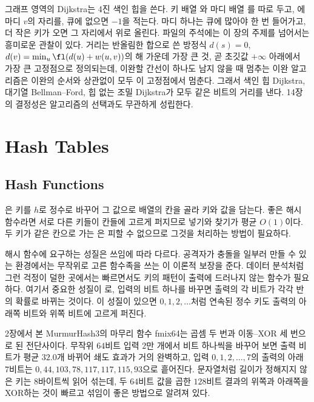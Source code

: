 \begin{instardust}
그래프 영역의 Dijkstra는 4진 색인 힙을 쓴다. 키 배열 와 마디 배열 를 따로 두고, 에 마디 $v$의 자리를, 큐에 없으면 $-1$을 적는다. 마디 하나는 큐에 많아야 한 번 들어가고, 더 작은 키가 오면 그 자리에서 위로 올린다. 파일의 주석에는 이 장의 주제를 넘어서는 흥미로운 관찰이 있다. 거리는 반올림한 합으로 쓴 방정식 $d(s)=0$, $d(v)=\min_u\fl(d(u)+w(u,v))$의 해 가운데 가장 큰 것, 곧 초깃값 $+\infty$ 아래에서 가장 큰 고정점으로 정의되는데, 이완할 간선이 하나도 남지 않을 때 멈추는 이완 알고리즘은 이완의 순서와 상관없이 모두 이 고정점에서 멈춘다. 그래서 색인 힙 Dijkstra, 대기열 Bellman--Ford, 힙 없는 조밀 Dijkstra가 모두 같은 비트의 거리를 낸다. 14장의 결정성은 알고리즘의 선택과도 무관하게 성립한다.
\end{instardust}

\section{Hash Tables}
\label{sec:hash-table}

\subsection{Hash Functions}

은 키를  $h$로 정수로 바꾸어 그 값으로 배열의 칸을 골라 키와 값을 담는다. 좋은 해시 함수라면 서로 다른 키들이 칸들에 고르게 퍼지므로 넣기와 찾기가 평균 $O(1)$이다. 두 키가 같은 칸으로 가는 은 피할 수 없으므로 그것을 처리하는 방법이 필요하다.

해시 함수에 요구하는 성질은 쓰임에 따라 다르다. 공격자가 충돌을 일부러 만들 수 있는 환경에서는 무작위로 고른 함수족을 쓰는 이 이론적 보장을 준다\cite{carter1979universal}. 데이터 분석처럼 그런 걱정이 덜한 곳에서는 빠르면서도 키의 패턴이 출력에 드러나지 않는 함수가 필요하다. 여기서 중요한 성질이 로, 입력의 비트 하나를 바꾸면 출력의 각 비트가 각각 반의 확률로 바뀌는 것이다. 이 성질이 있으면 $0,1,2,\dots$처럼 연속된 정수 키도 출력의 아래쪽 비트와 위쪽 비트에 고르게 퍼진다.

2장에서 본 MurmurHash3의 마무리 함수 fmix64는 곱셈 두 번과 이동--XOR 세 번으로 된 전단사이다\cite{appleby-smhasher}. 무작위 $64$비트 입력 $2$만 개에서 비트 하나씩을 바꾸어 보면 출력 비트가 평균 $32.0$개 바뀌어 쇄도 효과가 거의 완벽하고, 입력 $0,1,2,\dots,7$의 출력의 아래 $7$비트는 $0,44,103,78,117,117,115,93$으로 흩어진다. 문자열처럼 길이가 정해지지 않은 키는 $8$바이트씩 읽어 섞는데, 두 $64$비트 값을 곱한 $128$비트 결과의 위쪽과 아래쪽을 XOR하는 것이 빠르고 섞임이 좋은 방법으로 알려져 있다.

